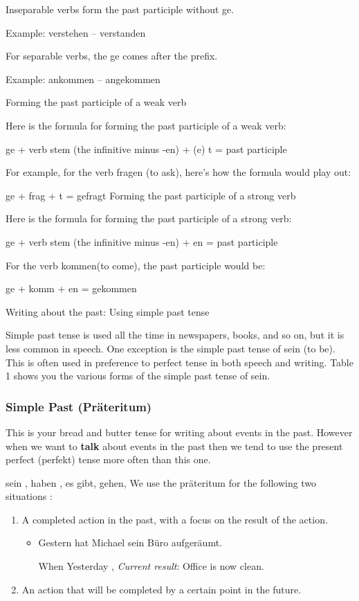 \documentclass[a4paper,twocolumn,10pt]{article}
\newcommand{\newpar}
{\par \vspace{0.3cm}}
\newcommand{\subsubsectionend}
{
\nolinenumbers
\linenumbers
}
\begin{document}
Inseparable verbs form the past participle
without ge.

Example:
verstehen – verstanden

For separable verbs, the ge
comes after the prefix.

Example:
ankommen –
angekommen

Forming the past participle of a weak verb

Here is the formula for forming the past participle of a weak verb:

ge + verb stem (the infinitive minus -en) + (e) t = past participle

For example, for the verb fragen (to ask), here’s how the formula would play
out:

ge + frag + t = gefragt
Forming the past participle of a strong verb

Here is the formula for forming the past participle of a strong verb:

ge + verb stem (the infinitive minus -en) + en = past participle

For the verb kommen(to come), the past participle would be:

ge + komm + en = gekommen

Writing about the past: Using simple past tense

Simple past tense is used all the time in newspapers, books, and so on, but it
is less common in speech. One exception is the simple past tense of sein (to
be). This is often used in preference to perfect tense in both speech and
writing. Table 1 shows you the various forms of the simple past tense of sein.



\subsubsectionend

\subsubsection{Simple Past (Präteritum)}
\label{sssec:simple_past}
This is your bread and butter tense for writing about events in the past.
However when we want to \textbf{talk} about events in the past then we tend to
use the present perfect (perfekt) tense more often than this one.\newpar


sein , haben , es gibt, gehen,
We use the präteritum for the following two situations :

\begin{enumerate}
	\item A completed action in the past, with a focus on the result of the
		action.
	\begin{itemize}
		\item Gestern hat Michael sein Büro aufgeräumt.

	\vspace{0.25cm}

		When Yesterday ,
		\vspace{0.25cm}
		\textit {Current result}: Office is now clean.
	\end{itemize}
	\item An action that will be completed by a certain point in the future.
\end{enumerate}
\end{document}
